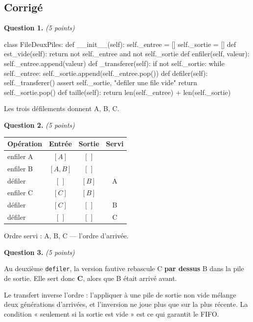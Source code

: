 \subsection*{Corrigé}

\textbf{Question 1.} \emph{(5 points)}

\begin{python}
class FileDeuxPiles:
    def __init__(self):
        self._entree = []
        self._sortie = []
    def est_vide(self):
        return not self._entree and not self._sortie
    def enfiler(self, valeur):
        self._entree.append(valeur)
    def _transferer(self):
        if not self._sortie:
            while self._entree:
                self._sortie.append(self._entree.pop())
    def defiler(self):
        self._transferer()
        assert self._sortie, "defiler une file vide"
        return self._sortie.pop()
    def taille(self):
        return len(self._entree) + len(self._sortie)
\end{python}

Les trois défilements donnent A, B, C.

\medskip
\textbf{Question 2.} \emph{(5 points)}

\begin{center}
\begin{tabular}{|l|c|c|c|}
\hline
\textbf{Opération} & \textbf{Entrée} & \textbf{Sortie} & \textbf{Servi} \\
\hline
enfiler A & $[A]$ & $[\,]$ & \\
\hline
enfiler B & $[A, B]$ & $[\,]$ & \\
\hline
défiler & $[\,]$ & $[B]$ & A \\
\hline
enfiler C & $[C]$ & $[B]$ & \\
\hline
défiler & $[C]$ & $[\,]$ & B \\
\hline
défiler & $[\,]$ & $[\,]$ & C \\
\hline
\end{tabular}
\end{center}

Ordre servi : A, B, C — l'ordre d'arrivée.

\medskip
\textbf{Question 3.} \emph{(5 points)}

Au deuxième \lstinline{defiler}, la version fautive rebascule C \textbf{par
dessus} B dans la pile de sortie. Elle sert donc \textbf{C}, alors que B était
arrivé avant.

Le transfert inverse l'ordre : l'appliquer à une pile de sortie non vide
mélange deux générations d'arrivées, et l'inversion ne joue plus que sur la
plus récente. La condition « seulement si la sortie est vide » est ce qui
garantit le FIFO.

